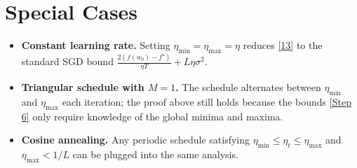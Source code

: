 \documentclass{article}
\begin{document}
\section*{Special Cases}
\begin{itemize}
\item \textbf{Constant learning rate.} Setting $\eta_{\min}=\eta_{\max}=\eta$ reduces
\eqref{13} to the standard SGD bound $\frac{2(f(w_{0})-f^{\star})}{\eta T}+L\eta\sigma^{2}$.
\item \textbf{Triangular schedule with $M=1$.} The schedule alternates between
$\eta_{\min}$ and $\eta_{\max}$ each iteration; the proof above still holds because
the bounds \eqref{Step 6} only require knowledge of the global minima and maxima.
\item \textbf{Cosine annealing.} Any periodic schedule satisfying
$\eta_{\min}\le\eta_{t}\le\eta_{\max}$ and $\eta_{\max}<1/L$ can be plugged into the same analysis.
\end{itemize}
\end{document}
